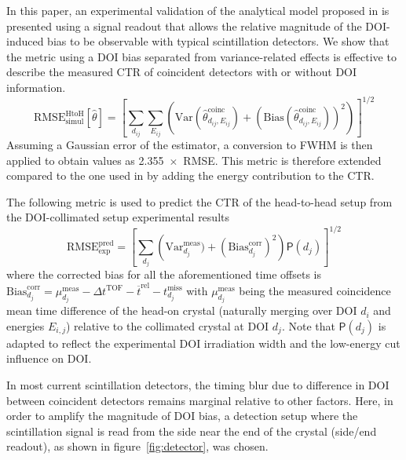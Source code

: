 \documentclass[demo]{OUP-EJ}
\begin{document}
In this paper, an experimental validation of the analytical model proposed in \cite{Toussaint2019} is presented using a signal readout that allows the relative magnitude of the DOI-induced bias to be observable with typical scintillation detectors.
We show that the metric using a DOI bias separated from variance-related effects is effective to describe the measured CTR of coincident detectors with or without DOI information.
\begin{equation}
        \label{eq:rmsehtoh}
        \mathrm{RMSE}_{\mathrm{simul}}^{\mathrm{HtoH}}[\widehat{\theta}] = \left[\sum_{d_{ij}}\sum_{E_{ij}} \left( \mathrm{Var}(\widehat{\theta}^{\mathrm{coinc}}_{d_{ij},E_{ij}}) + (\mathrm{Bias}(\widehat{\theta}^{\mathrm{coinc}}_{d_{ij},E_{ij}}))^2 \right)\right]^{1/2}
\end{equation}
Assuming a Gaussian error of the estimator, a conversion to FWHM is then applied to obtain values as 2.355~$\times$~RMSE.
This metric is therefore extended compared to the one used in \cite{Toussaint2019} by adding the energy contribution to the CTR.

The following metric is used to predict the CTR of the head-to-head setup from the DOI-collimated setup experimental results
\begin{equation}
 \label{eq:rmsedoicoll}
        \mathrm{RMSE}_{\mathrm{\textrm{exp}}}^{\mathrm{pred}} = \left[\sum_{d_{j}} \left( \mathrm{Var}^{\mathrm{meas}}_{d_{j}}) + (\mathrm{Bias}^{\mathrm{corr}}_{d_{j}})^2 \right) \mathsf{P}(d_{j}) \right]^{1/2}
\end{equation}
where the corrected bias for all the aforementioned time offsets is $\mathrm{Bias}^{\mathrm{corr}}_{d_{j}} = \mu_{d_j}^{\mathrm{meas}} - \Delta t^{\mathrm{TOF}} - \overline{t}^{\mathrm{rel}} - t_{d_j}^{\mathrm{miss}}$ with $\mu_{d_j}^{\mathrm{meas}}$ being the measured coincidence mean time difference of the head-on crystal (naturally merging over DOI $d_i$ and energies $E_{i,j}$) relative to the collimated crystal at DOI $d_j$.
Note that $\mathsf{P}(d_{j})$ is adapted to reflect the experimental DOI irradiation width and the low-energy cut influence on DOI.


In most current scintillation detectors, the timing blur due to difference in DOI between coincident detectors remains marginal relative to other factors.
Here, in order to amplify the magnitude of DOI bias, a detection setup where the scintillation signal is read from the side near the end of the crystal (side/end readout), as shown in figure~\ref{fig:detector}, was chosen.
\end{document}
